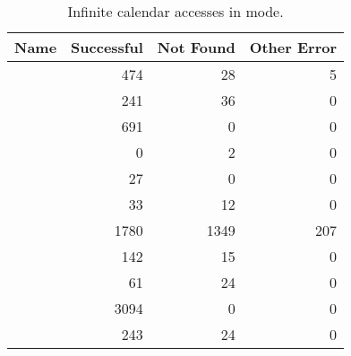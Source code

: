 \begin{centering}
  \begin{table}[htb]
    \centering
    {\scriptsize
      \begin{tabular}{|l|r|r|r|}
        \hline
        Name & Successful & Not Found & Other Error \\
        \hline
        \acunetix{} & 474 & 28 & 5 \\
        \appscan{} & 241 & 36 & 0 \\
        \burp{} & 691 & 0 & 0 \\
        \grendelscan{} & 0 & 2 & 0 \\
        \hailstorm{} & 27 & 0 & 0 \\
        \milescan{} & 33 & 12 & 0 \\
        \nstalker{} & 1780 & 1349 & 207 \\
        \ntospider{} & 142 & 15 & 0 \\
        \paros{} & 61 & 24 & 0 \\
        \waf{} & 3094 & 0 & 0 \\
        \webinspect{} & 243 & 24 & 0 \\
        \hline
    \end{tabular}}
    \caption{Infinite calendar accesses in \initial{} mode.}
    \label{calendar-access}
  \end{table}
\end{centering}
